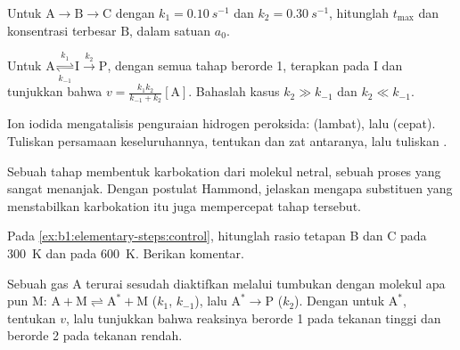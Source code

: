 \begin{exercise}[$\star\star$]\label{exo:b1:elementary-steps:5}
Untuk $\mathrm{A} \to \mathrm{B} \to \mathrm{C}$ dengan $k_1 =
\qty{0.10}{s^{-1}}$ dan $k_2 = \qty{0.30}{s^{-1}}$, hitunglah $t_{\max}$
dan konsentrasi terbesar $\mathrm{B}$, dalam satuan $a_0$.
\end{exercise}

\begin{exercise}[$\star\star$]\label{exo:b1:elementary-steps:6}
Untuk $\mathrm{A} \underset{k_{-1}}{\overset{k_1}{\rightleftharpoons}}
\mathrm{I} \xrightarrow{k_2} \mathrm{P}$, dengan semua tahap berorde 1,
terapkan  pada $\mathrm{I}$ dan tunjukkan bahwa
$v =
\frac{k_1k_2}{k_{-1} + k_2}[\mathrm{A}]$. Bahaslah kasus $k_2 \gg
k_{-1}$ dan $k_2 \ll k_{-1}$.
\end{exercise}

\begin{exercise}[$\star\star$]\label{exo:b1:elementary-steps:7}
Ion iodida mengatalisis penguraian hidrogen peroksida:
 (lambat), lalu 
(cepat). Tuliskan persamaan keseluruhannya, tentukan  dan zat
antaranya, lalu tuliskan .
\end{exercise}

\begin{exercise}[$\star\star$]\label{exo:b1:elementary-steps:8}
Sebuah tahap membentuk karbokation dari molekul netral, sebuah proses
yang sangat menanjak. Dengan postulat Hammond, jelaskan mengapa
substituen yang menstabilkan karbokation itu juga mempercepat tahap
tersebut.
\end{exercise}

\begin{exercise}[$\star\star$]\label{exo:b1:elementary-steps:9}
Pada \cref{ex:b1:elementary-steps:control}, hitunglah rasio tetapan  B dan C pada \qty{300}{K} dan pada \qty{600}{K}. Berikan
komentar.
\end{exercise}

\begin{exercise}[$\star\star\star$]\label{exo:b1:elementary-steps:10}
Sebuah gas $\mathrm{A}$ terurai sesudah diaktifkan melalui tumbukan dengan
molekul apa pun $\mathrm{M}$: $\mathrm{A} + \mathrm{M} \rightleftharpoons
\mathrm{A}^* + \mathrm{M}$ ($k_1$, $k_{-1}$), lalu $\mathrm{A}^* \to
\mathrm{P}$ ($k_2$). Dengan  untuk
$\mathrm{A}^*$, tentukan $v$, lalu tunjukkan bahwa reaksinya berorde 1
pada tekanan tinggi dan berorde 2 pada tekanan rendah.
\end{exercise}

